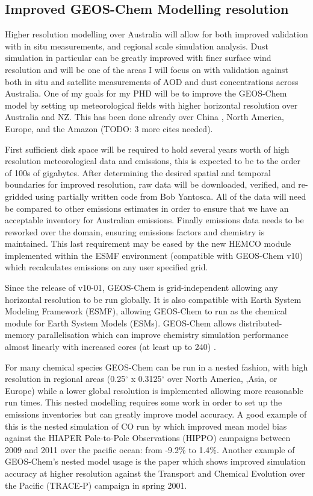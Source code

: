 \subsection{Improved GEOS-Chem Modelling resolution}

Higher resolution modelling over Australia will allow for both improved validation with in situ measurements, and regional scale simulation analysis. 
Dust simulation in particular can be greatly improved with finer surface wind resolution and will be one of the areas I will focus on with validation against both in situ and satellite measurements of AOD and dust concentrations across Australia.
One of my goals for my PHD will be to improve the GEOS-Chem model by setting up meteorological fields with higher horizontal resolution over Australia and NZ.
This has been done already over China \cite{Chen_2009,Wang_2004}, North America, Europe, and the Amazon (TODO: 3 more cites needed).

First sufficient disk space will be required to hold several years worth of high resolution meteorological data and emissions, this is expected to be to the order of 100s of gigabytes.
After determining the desired spatial and temporal boundaries for improved resolution, raw data will be downloaded, verified, and re-gridded using partially written code from Bob Yantosca.
All of the data will need be compared to other emissions estimates in order to ensure that we have an acceptable inventory for Australian emissions.
Finally emissions data needs to be reworked over the domain, ensuring emissions factors and chemistry is maintained.
This last requirement may be eased by the new HEMCO module implemented within the ESMF environment (compatible with GEOS-Chem v10) which recalculates emissions on any user specified grid.
  
Since the release of v10-01, GEOS-Chem is grid-independent allowing any horizontal resolution to be run globally. 
It is also compatible with Earth System Modeling Framework (ESMF), allowing GEOS-Chem to run as the chemical module for Earth System Models (ESMs). 
GEOS-Chem allows distributed-memory parallelisation which can improve chemistry simulation performance almost linearly with increased cores (at least up to 240) \cite{Long_2015}.

For many chemical species GEOS-Chem can be run in a nested fashion, with high resolution in regional areas (0.25$^{\circ}$ x 0.3125$^{\circ}$ over North America, ,Asia, or Europe) while a lower global resolution is implemented allowing more reasonable run times.
This nested modelling requires some work in order to set up the emissions inventories but can greatly improve model accuracy.
A good example of this is the nested simulation of CO run by \citet{Yan_2014} which improved mean model bias against the HIAPER Pole-to-Pole Observations (HIPPO) campaigns between 2009 and 2011 over the pacific ocean: from -9.2\% to 1.4\%.
Another example of GEOS-Chem's nested model usage is the \citet{Wang_2004} paper which shows improved simulation accuracy at higher resolution against the Transport and Chemical Evolution over the Pacific (TRACE-P) campaign in spring 2001. 

